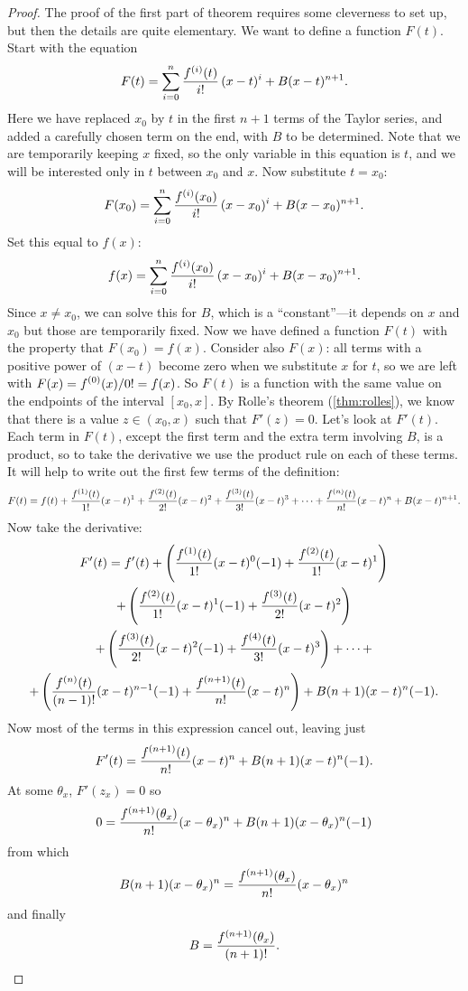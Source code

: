 \begin{proof}
The proof of the first part of theorem requires some cleverness to set up, but then the details are
quite elementary. We want to define a function $F(t)$. 
Start with the equation
$$F(t)=\sum_{i=0}^n{f^{(i)}(t)\over i!}\,(x-t)^i + B(x-t)^{n+1}.$$
Here we have replaced $x_0$ by $t$ in the first $n+1$ terms of the
Taylor series, and added a carefully chosen term on the end, with $B$
to be determined. Note that
we are temporarily keeping $x$ fixed, so the only variable in this
equation is $t$, and we will be interested
only in $t$ between $x_0$ and $x$. Now substitute $t=x_0$:
$$F(x_0)=\sum_{i=0}^n{f^{(i)}(x_0)\over i!}\,(x-x_0)^i + B(x-x_0)^{n+1}.$$
Set this equal to $f(x)$:
$$f(x)=\sum_{i=0}^n{f^{(i)}(x_0)\over i!}\,(x-x_0)^i + B(x-x_0)^{n+1}.$$
Since $x\not=x_0$, we can solve this for $B$, which is a
``constant''---it depends on $x$ and $x_0$ but those are temporarily 
fixed.  Now we
have defined a function $F(t)$ with the property that
$F(x_0)=f(x)$. Consider also $F(x)$: all terms with a positive power of
$(x-t)$ become zero when we substitute $x$ for $t$, so we are left
with $\displaystyle F(x)=f^{(0)}(x)/0!=f(x)$. So $F(t)$ is a function with the same
value on the endpoints of the interval $[x_0,x]$. 
By Rolle's theorem (\ref{thm:rolles}), we
know that there is a value $z\in(x_0,x)$ such that $F'(z)=0$. Let's look
at $F'(t)$. Each term in $F(t)$, except the first term and the extra
term involving $B$, is a product, so to take the derivative we use the
product rule on each of these terms. It will help to write out the
first few terms of the definition:
$$
  F(t)=f(t)+{f^{(1)}(t)\over 1!}(x-t)^1+{f^{(2)}(t)\over 2!}(x-t)^2+
  {f^{(3)}(t)\over 3!}(x-t)^3+\cdots
  +{f^{(n)}(t)\over n!}(x-t)^n+
  B(x-t)^{n+1}.
$$
Now take the derivative:
\allowdisplaybreaks
\begin{multline*}
  F'(t) = f'(t) + 
  \left({f^{(1)}(t)\over 1!}(x-t)^0(-1)+{f^{(2)}(t)\over
    1!}(x-t)^1\right)\\
  +\left({f^{(2)}(t)\over 1!}(x-t)^1(-1)+{f^{(3)}(t)\over
    2!}(x-t)^2\right)\\
  +\left({f^{(3)}(t)\over 2!}(x-t)^2(-1)+{f^{(4)}(t)\over
    3!}(x-t)^3\right)+\dots+\\
  +\left({f^{(n)}(t)\over (n-1)!}(x-t)^{n-1}(-1)+{f^{(n+1)}(t)\over
    n!}(x-t)^n\right)  +B(n+1)(x-t)^n(-1).
\end{multline*}
Now most of the terms in this expression cancel out,
leaving just
$$F'(t) = {f^{(n+1)}(t)\over n!}(x-t)^n+B(n+1)(x-t)^n(-1).$$
At some $\theta_x$, $F'(z_x)=0$ so
$$
  0={f^{(n+1)}(\theta_x)\over n!}(x-\theta_x)^n+B(n+1)(x-\theta_x)^n(-1)
$$
from which
$$
  B(n+1)(x-\theta_x)^n={f^{(n+1)}(\theta_x)\over n!}(x-\theta_x)^n
$$
and finally
$$
  B={f^{(n+1)}(\theta_x)\over (n+1)!}.
$$


\end{proof}
